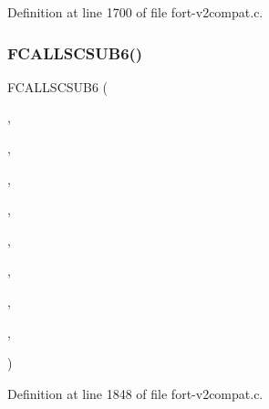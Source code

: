 Definition at line 1700 of file fort-\/v2compat.\+c.

\mbox{\label{fort-v2compat_8c_ac622f0104673733887ae0c1af938f237}} 
\subsubsection{\texorpdfstring{F\+C\+A\+L\+L\+S\+C\+S\+U\+B6()}{FCALLSCSUB6()}\hspace{0.1cm}{\footnotesize\ttfamily [5/6]}}
{\footnotesize\ttfamily F\+C\+A\+L\+L\+S\+C\+S\+U\+B6 (\begin{DoxyParamCaption}\item[{\hyperlink{nf__v2compat_8c_af2970c38a778d0445024e98efe3ae008}{c\+\_\+ncagtc}}]{,  }\item[{N\+C\+A\+G\+TC}]{,  }\item[{\hyperlink{nf__fortv2_8f90_acdffb4e9e53796cfadcf86a802a159b3}{ncagtc}}]{,  }\item[{N\+C\+ID}]{,  }\item[{V\+A\+R\+ID}]{,  }\item[{S\+T\+R\+I\+NG}]{,  }\item[{C\+B\+UF}]{,  }\item[{\hyperlink{fort-v2compat_8c_a5274f0ce0562c9ab9da4004e7d85d738}{A\+T\+T\+L\+EN}}]{,  }\item[{\hyperlink{fort-v2compat_8c_ae2352f39cbd25bcaf1bedbbb12db73fe}{P\+R\+C\+O\+DE}}]{ }\end{DoxyParamCaption})}



Definition at line 1848 of file fort-\/v2compat.\+c.

\mbox{\label{fort-v2compat_8c_a344033c85730782d2917dbe854fe83ac}} 
